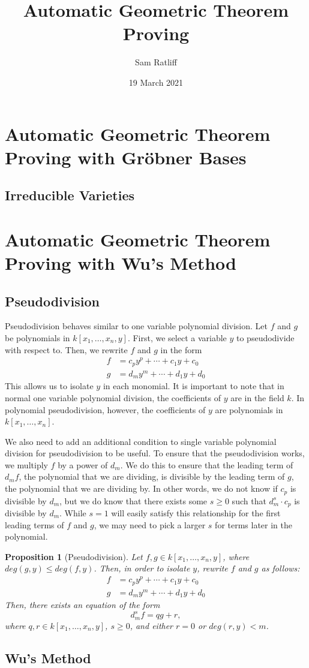 \documentclass{article}
\title{Automatic Geometric Theorem Proving}
\author{Sam Ratliff}
\date{19 March 2021}
\theoremstyle{plain}
\newtheorem{Proposition}[Theorem]{Proposition}
\theoremstyle{definition}
\theoremstyle{remark}
\begin{document}
\maketitle



\section{Automatic Geometric Theorem Proving with Gröbner Bases}
\subsection{Irreducible Varieties}

\section{Automatic Geometric Theorem Proving with Wu's Method}
\subsection{Pseudodivision}
Pseudodivision behaves similar to one variable polynomial division. Let $f$ and $g$ be polynomials in $k[x_1,\dots,x_n,y]$. First, we select a variable $y$ to pseudodivide with respect to. Then, we rewrite $f$ and $g$ in the form 
\begin {align*}
    f & = c_py^p + \cdots + c_1y + c_0\\
    g & = d_my^m + \cdots + d_1y + d_0
\end{align*}
This allows us to isolate $y$ in each monomial. It is important to note that in normal one variable polynomial division, the coefficients of $y$ are in the field $k$. 
In polynomial pseudodivision, however, the coefficients of $y$ are polynomials in $k[x_1,\dots,x_n]$.

We also need to add an additional condition to single variable polynomial division for pseudodivision to be useful. 
To ensure that the pseudodivision works, we multiply $f$ by a power of $d_m$. 
We do this to ensure that the leading term of $d_m f$, the polynomial that we are dividing, is divisible by the leading term of $g$, the polynomial that we are dividing by. 
In other words, we do not know if $c_p$ is divisible by $d_m$, but we do know that there exists some $s \geq 0$ such that $d_m^s\cdot c_p$ is divisible by $d_m$.
While $s = 1$ will easily satisfy this relationship for the first leading terms of $f$ and $g$, we may need to pick a larger $s$ for terms later in the polynomial.
\begin{Proposition}[Pseudodivision]
Let $f, g \in k[x_1,\dots,x_n,y]$, where $deg(g,y) \leq deg(f,y)$. Then, in order to isolate $y$, rewrite $f$ and $g$ as follows:
\begin {align*}
    f & = c_py^p + \cdots + c_1y + c_0\\
    g & = d_my^m + \cdots + d_1y + d_0
\end{align*}
Then, there exists an equation of the form $$d_m^s f = qg + r,$$ where $q,r \in k[x_1,\dots,x_n,y]$, $s \geq 0$, and either $r = 0$ or $deg(r,y) < m$.
\end{Proposition}


\subsection{Wu's Method}
\end{document}
